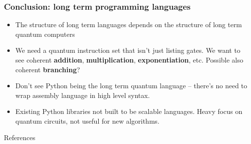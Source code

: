 \documentclass{beamer}
\begin{document}
\begin{frame}
\frametitle{Conclusion: long term programming languages}
\begin{itemize}
\item The structure of long term languages depends on the structure of long term quantum computers
\item We need a quantum instruction set that isn't just listing gates. We want to see coherent \textbf{addition}, \textbf{multiplication}, \textbf{exponentiation}, etc. Possible also coherent \textbf{branching}?
\item Don't see Python being the long term quantum language -- there's no need to wrap assembly language in high level syntax. 
\item Existing Python libraries not built to be scalable languages. Heavy focus on quantum circuits, not useful for new algorithms.
\end{itemize}
\end{frame}

\begin{frame}{References}


\end{frame}
\end{document}
